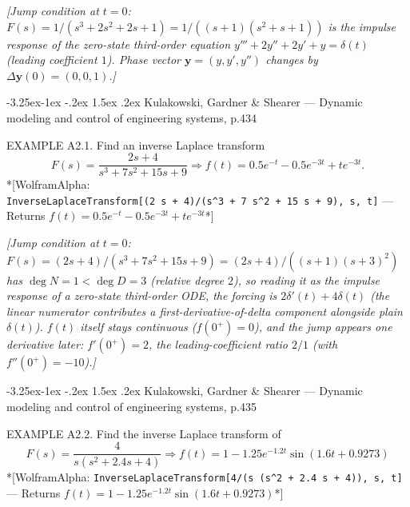 \documentclass[
  11pt,
]{article}
\makeatletter
\providecommand{\implies}{\Longrightarrow}
\renewcommand\paragraph{\@startsection{paragraph}{4}{\z@}%
                                     {-3.25ex\@plus -1ex \@minus -.2ex}%
                                     {1.5ex \@plus .2ex}%
                                     {\normalfont\normalsize\bfseries}}
\makeatother
\begin{document}
\emph{{[}Jump condition at \(t=0\):
\(F(s)=1/(s^3+2s^2+2s+1)=1/((s+1)(s^2+s+1))\) is the impulse response of
the zero-state third-order equation \(y'''+2y''+2y'+y=\delta(t)\)
(leading coefficient \(1\)). Phase vector \(\mathbf y=(y,y',y'')\)
changes by \(\Delta\mathbf y(0)=(0,0,1)\).{]}}

\hypertarget{kulakowski-gardner-shearer-dynamic-modeling-and-control-of-engineering-systems-p.434}{%
\paragraph{Kulakowski, Gardner \& Shearer --- Dynamic modeling and
control of engineering systems,
p.434}\label{kulakowski-gardner-shearer-dynamic-modeling-and-control-of-engineering-systems-p.434}}

EXAMPLE A2.1. Find an inverse Laplace transform \[
F(s) = \frac{2s + 4}{s^3 + 7s^2 + 15s + 9} \implies f(t) = 0.5e^{-t} - 0.5e^{-3t} + te^{-3t}.
\] *{[}WolframAlpha:
\texttt{InverseLaplaceTransform{[}(2\ s\ +\ 4)/(s\^{}3\ +\ 7\ s\^{}2\ +\ 15\ s\ +\ 9),\ s,\ t{]}}
--- Returns \(f(t) = 0.5e^{-t} - 0.5e^{-3t} + te^{-3t}\)*{]}

\emph{{[}Jump condition at \(t=0\):
\(F(s)=(2s+4)/(s^3+7s^2+15s+9)=(2s+4)/((s+1)(s+3)^2)\) has
\(\deg N=1<\deg D=3\) (relative degree \(2\)), so reading it as the
impulse response of a zero-state third-order ODE, the forcing is
\(2\delta'(t)+4\delta(t)\) (the linear numerator contributes a
first-derivative-of-delta component alongside plain \(\delta(t)\)).
\(f(t)\) itself stays continuous (\(f(0^+)=0\)), and the jump appears
one derivative later: \(f'(0^+)=2\), the leading-coefficient ratio
\(2/1\) (with \(f''(0^+)=-10\)).{]}}

\hypertarget{kulakowski-gardner-shearer-dynamic-modeling-and-control-of-engineering-systems-p.435}{%
\paragraph{Kulakowski, Gardner \& Shearer --- Dynamic modeling and
control of engineering systems,
p.435}\label{kulakowski-gardner-shearer-dynamic-modeling-and-control-of-engineering-systems-p.435}}

EXAMPLE A2.2. Find the inverse Laplace transform of \[
F(s) = \frac{4}{s(s^2 + 2.4s + 4)} \implies f(t) = 1 - 1.25e^{-1.2t}\sin(1.6t + 0.9273)
\] *{[}WolframAlpha:
\texttt{InverseLaplaceTransform{[}4/(s\ (s\^{}2\ +\ 2.4\ s\ +\ 4)),\ s,\ t{]}}
--- Returns \(f(t) = 1 - 1.25e^{-1.2t}\sin(1.6t + 0.9273)\)*{]}
\end{document}
